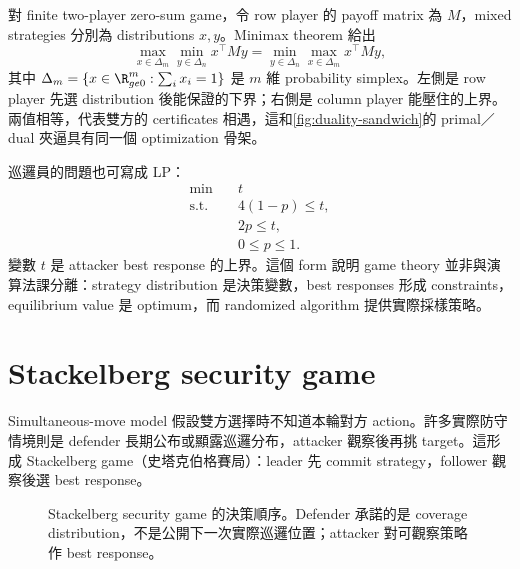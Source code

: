 \documentclass[11pt,a4paper,oneside,openany]{book}
\begin{document}
對 finite two-player zero-sum game，令 row player 的 payoff matrix 為 $M$，mixed strategies 分別為 distributions $x,y$。Minimax theorem 給出
\begin{equation}
 \max_{x\in\Delta_m}\min_{y\in\Delta_n}x^\top My
 =
 \min_{y\in\Delta_n}\max_{x\in\Delta_m}x^\top My,
 \label{eq:minimax-theorem}
\end{equation}
其中 $\Delta_m=\{x\in\R_{ge0}^m:\sum_i x_i=1\}$ 是 $m$ 維 probability simplex。左側是 row player 先選 distribution 後能保證的下界；右側是 column player 能壓住的上界。兩值相等，代表雙方的 certificates 相遇，這和\cref{fig:duality-sandwich}的 primal／dual 夾逼具有同一個 optimization 骨架。

巡邏員的問題也可寫成 LP：
\begin{align*}
 \min\quad&t\\
 \text{s.t.}\quad&4(1-p)\le t,\\
 &2p\le t,\\
 &0\le p\le1.
\end{align*}
變數 $t$ 是 attacker best response 的上界。這個 form 說明 game theory 並非與演算法課分離：strategy distribution 是決策變數，best responses 形成 constraints，equilibrium value 是 optimum，而 randomized algorithm 提供實際採樣策略。

\section{Stackelberg security game}
Simultaneous-move model 假設雙方選擇時不知道本輪對方 action。許多實際防守情境則是 defender 長期公布或顯露巡邏分布，attacker 觀察後再挑 target。這形成 Stackelberg game（史塔克伯格賽局）：leader 先 commit strategy，follower 觀察後選 best response。

\begin{figure}[htbp]
\centering
{}
\caption{Stackelberg security game 的決策順序。Defender 承諾的是 coverage distribution，不是公開下一次實際巡邏位置；attacker 對可觀察策略作 best response。}
\label{fig:stackelberg-security}
\end{figure}
\end{document}
